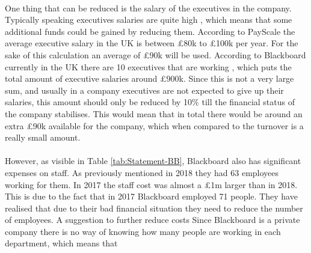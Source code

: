 \documentclass[]{article}
\begin{document}
\paragraph{}
One thing that can be reduced is the salary of the executives in the company. Typically speaking executives salaries are quite high \cite{Executives}, which means that some additional funds could be gained by reducing them. According to PayScale \cite{Executives-avg-salary} the average executive salary in the UK is between £80k to £100k per year. For the sake of this calculation an average of £90k will be used. According to Blackboard currently in the UK there are 10 executives that are working \cite{leaders-BB}, which puts the total amount of executive salaries around £900k. Since this is not a very large sum, and usually in a company executives are not expected to give up their salaries, this amount should only be reduced by 10\% till the financial status of the company stabilises. This would mean that in total there would be around an extra £90k available for the company, which when compared to the turnover is a really small amount.

\paragraph{}
However, as visible in Table \ref{tab:Statement-BB}, Blackboard also has significant expenses on staff. As previously mentioned in 2018 they had 63 employees working for them. In 2017 the staff cost was almost a £1m larger than in 2018. This is due to the fact that in 2017 Blackboard employed 71 people. They have realised that due to their bad financial situation they need to reduce the number of employees. A suggestion to further reduce costs Since Blackboard is a private company there is no way of knowing how many people are working in each department, which means that 

\newpage





\printbibliography{}
\end{document}
